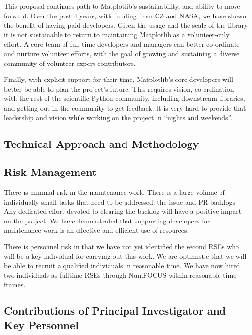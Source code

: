 \documentclass[12pt]{article}
\numberwithin{page}{section}
\begin{document}
This proposal continues path to Matplotlib's sustainability, and ability to
move forward.  Over the past 4 years, with funding from CZ and NASA, we have
shown the benefit of having paid developers.  Given the usage and the scale of
the library it is not sustainable to return to maintaining Matplotlib as a
volunteer-only effort.  A core team of full-time developers and managers can
better co-ordinate and nurture volunteer efforts, with the goal of growing and
sustaining a diverse community of volunteer expert contributors.

Finally, with explicit support for their time, Matplotlib's core developers
will better be able to plan the project's future.  This requires vision,
co-ordination with the rest of the scientific Python community, including
downstream libraries, and getting out in the community to get feedback.  It is
very hard to provide that leadership and vision while working on the project in
``nights and weekends''.

\subsection{Technical Approach and Methodology}

\subsection{Risk Management}

There is minimal risk in the maintenance work.  There is a large volume
of individually small tasks that need to be addressed: the issue and
PR backlogs.  Any dedicated effort devoted to clearing the backlog
will have a positive impact on the project.  We have demonstrated that
supporting developers for maintenance work is an effective and
efficient use of resources.


There is personnel risk in that we have not yet identified the second RSEs who
will be a key individual for carrying out this work.  We are optimistic that we
will be able to recruit a qualified individuals in reasonable time.  We have
now hired two individuals as fulltime RSEs through NumFOCUS within reasonable
time frames.

\subsection{Contributions of Principal Investigator and Key Personnel}
\end{document}
